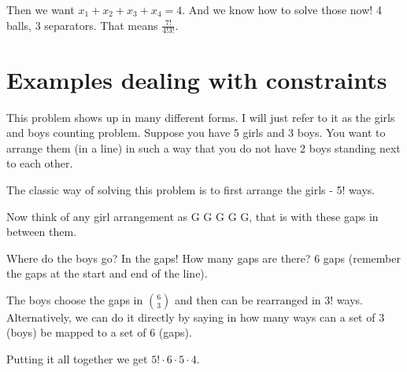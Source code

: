 \documentclass[12pt]{article}
\begin{document}
Then we want $x_1 + x_2 + x_3 + x_4 = 4$. And we know how to solve those now! 4 balls, 3 separators. That means $\frac{7!}{4!3!}$.

\section*{Examples dealing with constraints}
This problem shows up in many different forms. I will just refer to it as the girls and boys counting problem. Suppose you have 5 girls and 3 boys. You want to arrange them (in a line) in such a way that you do not have 2 boys standing next to each other. 

The classic way of solving this problem is to first arrange the girls - 5! ways.

Now think of any girl arrangement as G G G G G, that is with these gaps in between them.

Where do the boys go? In the gaps! How many gaps are there? 6 gaps (remember the gaps at the start and end of the line). 

The boys choose the gaps in $\binom{6}{3}$ and then can be rearranged in 3! ways. Alternatively, we can do it directly by saying in how many ways can a set of 3 (boys) be mapped to a set of 6 (gaps).

Putting it all together we get $5! \cdot 6\cdot 5\cdot 4$.  
\end{document}
